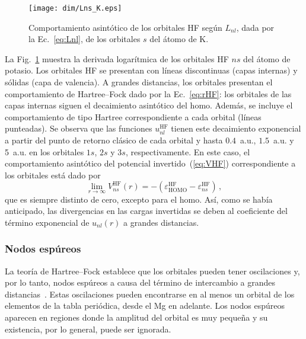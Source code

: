 \begin{figure}[t]
\centering
\texttt{[image: dim/Lns\_K.eps]} 
\caption[Comportamiento asintótico de los orbitales HF.]
{Comportamiento asintótico de los orbitales HF según $L_{nl}$, dada por 
la Ec.~\ref{eq:Lnl}, de los orbitales $s$ del átomo de K.}
\label{fig:LnsK}
\end{figure}

La Fig.~\ref{fig:LnsK} muestra la derivada logarítmica de los orbitales 
HF $ns$ del átomo de potasio. Los orbitales HF se presentan con líneas 
discontinuas (capas internas) y sólidas (capa de valencia). A grandes 
distancias, los orbitales presentan el comportamiento de Hartree--Fock 
dado por la Ec.~\ref{eq:rHF}: los orbitales de las capas internas siguen 
el decaimiento asintótico del \acs{homo}. Además, se incluye el 
comportamiento de tipo Hartree correspondiente a cada orbital (líneas 
punteadas). Se observa que las funciones $u_{nl}^{\mathrm{HF}}$ tienen 
este decaimiento exponencial a partir del punto de retorno clásico de 
cada orbital y hasta $0.4$~a.u., $1.5$~a.u. y 5~a.u. en los orbitales 
$1s$, $2s$ y $3s$, respectivamente. 
En este caso, el comportamiento asintótico del potencial 
invertido~(\ref{eq:VHF}) correspondiente a los orbitales está dado por
\begin{equation}
\lim_{r \rightarrow \infty} V_{ns}^{\mathrm{HF}}(r)=
-\left(\varepsilon_{\mathrm{HOMO}}^{\mathrm{HF}}
-\varepsilon_{ns}^{\mathrm{HF}}\right) \,,
\label{eq:asintoticoVHF}
\end{equation}
que es siempre distinto de cero, excepto para el \acs{homo}. Así, como 
se había anticipado, las divergencias en las cargas invertidas se deben 
al coeficiente del término exponencial de $u_{nl}(r)$ a grandes 
distancias. 

\subsubsection*{Nodos espúreos}

La teoría de Hartree--Fock establece que los orbitales pueden tener 
oscilaciones y, por lo tanto, nodos espúreos a causa del término de 
intercambio a grandes distancias~\cite{FroeseFischer:97}. Estas 
oscilaciones pueden encontrarse en al menos un orbital de los elementos 
de la tabla periódica, desde el Mg en adelante. Los nodos espúreos 
aparecen en regiones donde la amplitud del orbital es muy pequeña y su 
existencia, por lo general, puede ser ignorada. 

